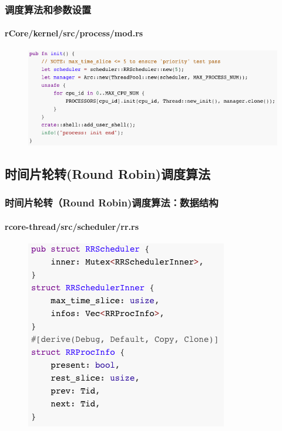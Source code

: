 \begin{frame}[fragile]
    \frametitle{调度算法和参数设置}
    \framesubtitle{rCore/kernel/src/process/mod.rs}
\begin{figure}
    \includegraphics[width=1.0\linewidth]{figs/scheduler-init.png}
    \end{figure}
\end{frame}
% 
% 
% 
\subsection{时间片轮转(Round Robin)调度算法} %
\begin{frame}[fragile]
    \frametitle{时间片轮转（Round Robin)调度算法：数据结构}
    \framesubtitle{rcore-thread/src/scheduler/rr.rs}
    \begin{figure}
    \includegraphics[width=0.45\linewidth]{figs/RRScheduler.png}
    \end{figure}
\end{frame}

